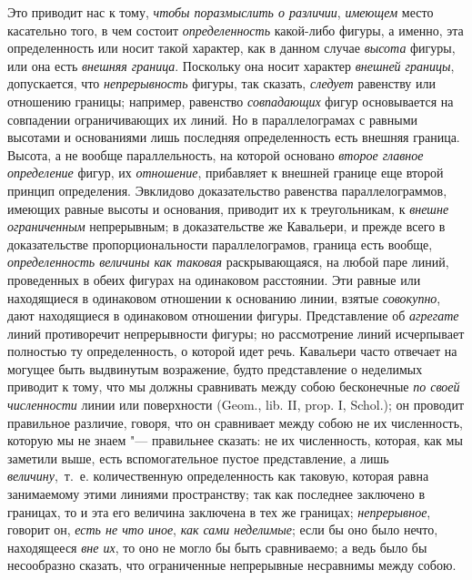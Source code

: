 Это приводит нас к тому, {\em чтобы поразмыслить о
различии}, {\em имеющем} место касательно того, в чем
состоит {\em определенность} какой-либо фигуры, а
именно, эта определенность или носит такой характер, как в данном случае
{\em высота} фигуры, или она есть
{\em внешняя граница}. Поскольку она носит характер
{\em внешней границы}, допускается, что
{\em непрерывность} фигуры, так сказать,
{\em следует} равенству или отношению границы;
например, равенство {\em совпадающих} фигур
основывается на совпадении ограничивающих их линий. Но в параллелограмах с
равными высотами и основаниями лишь последняя определенность есть внешняя
граница. Высота, а не вообще параллельность, на которой основано
{\em второе главное определение} фигур, их
{\em отношение}, прибавляет к внешней границе еще
второй принцип определения. Эвклидово доказательство равенства
параллелограммов, имеющих равные высоты и основания, приводит их к
треугольникам, к {\em внешне ограниченным} непрерывным;
в доказательстве же Кавальери, и прежде всего в доказательстве
пропорциональности параллелограмов, граница есть вообще,
{\em определенность величины как таковая}
раскрывающаяся, на любой паре линий, проведенных в обеих фигурах на
одинаковом расстоянии. Эти равные или находящиеся в одинаковом отношении к
основанию линии, взятые {\em совокупно}, дают
находящиеся в одинаковом отношении фигуры. Представление об
{\em агрегате} линий противоречит непрерывности фигуры;
но рассмотрение линий исчерпывает полностью ту определенность, о которой
идет речь. Кавальери часто отвечает на могущее быть выдвинутым возражение,
будто представление о неделимых приводит к тому, что мы должны сравнивать
между собою бесконечные {\em по своей численности}
линии или поверхности (Geom., lib. II, prop. I, Schol.); он проводит
правильное различие, говоря, что он сравнивает между собою не их
численность, которую мы не знаем "--- правильнее сказать: не их численность,
которая, как мы заметили выше, есть вспомогательное пустое представление, а
лишь {\em величину},~т.~е. количественную
определенность как таковую, которая равна занимаемому этими линиями
пространству; так как последнее заключено в границах, то и эта его величина
заключена в тех же границах; {\em непрерывное}, говорит
он, {\em есть не что иное},{\em 
как сами неделимые}; если бы оно было нечто, находящееся
{\em вне их}, то оно не могло бы быть сравниваемо; а
ведь было бы несообразно сказать, что ограниченные непрерывные несравнимы
между собою.

